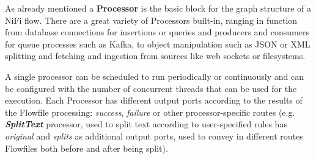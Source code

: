 As already mentioned a \textbf{Processor} is the basic block for the graph structure of a NiFi flow. There are a great variety of Processors built-in, ranging in function from database connections for insertions or queries and producers and consumers for queue processes such as Kafka, to object manipulation such as JSON or XML splitting and fetching and ingestion from sources like web sockets or filesystems.

A single processor can be scheduled to run periodically or continuously and can be configured with the number of concurrent threads that can be used for the execution. Each Processor has different output ports according to the results of the Flowfile processing: \textit{success}, \textit{failure} or other processor-specific routes (e.g. \textit{\textbf{SplitText}} processor, used to split text according to user-specified rules has \textit{original} and \textit{splits} as additional output ports, used to convey in different routes Flowfiles both before and after being split).
